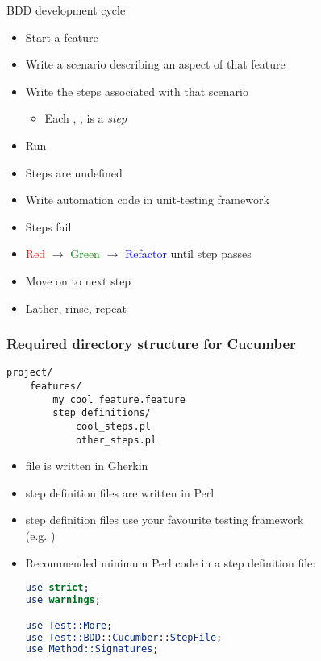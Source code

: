 \documentclass[10pt]{vcs_beamer}
\newcommand{\Given}{\color{DarkOrange}{Given}}
\newcommand{\When}{\color{RoyalBlue}{When}}
\newcommand{\Then}{\color{ForestGreen}{Then}}
\begin{document}
\begin{frame}{BDD development cycle}
    \begin{itemize}
        \item Start a feature
        \item Write a scenario describing an aspect of that feature
        \item Write the steps associated with that scenario
            \begin{itemize}
                \item Each \ttt{\Given}, \ttt{\When}, \ttt{\Then} is a \emph{step}
            \end{itemize}
        \item Run 
        \item Steps are undefined
        \item Write automation code in unit-testing framework
        \item Steps fail
        \item \textcolor{red}{Red} $\rightarrow$ \textcolor{green}{Green}
            $\rightarrow$ \textcolor{blue}{Refactor} until step passes
        \item Move on to next step
        \item Lather, rinse, repeat
    \end{itemize}
\end{frame}

\begin{frame}[fragile]
\frametitle{Required directory structure for Cucumber}

\begin{lstlisting}
project/
    features/
        my_cool_feature.feature
        step_definitions/
            cool_steps.pl
            other_steps.pl
\end{lstlisting}

\begin{itemize}
    \item {} file is written in Gherkin
    \item step definition files are written in Perl
    \item step definition files use your favourite testing framework\\
        (e.g. )
    \item Recommended minimum Perl code in a step definition file:
\begin{lstlisting}[language=perl]
use strict;
use warnings;

use Test::More;
use Test::BDD::Cucumber::StepFile;
use Method::Signatures;
\end{lstlisting}
\end{itemize}

\end{frame}
\end{document}
